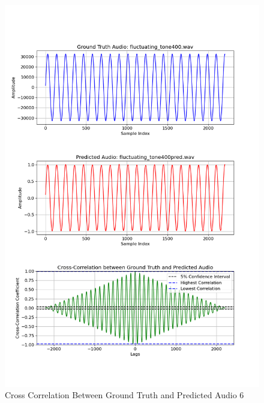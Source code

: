 \documentclass{ioereport}
\begin{document}
    \begin{figure}[H]
        \centering
        \includegraphics[width=\linewidth]{assets/crosscorrelation/cross_correlation_fluctuating_tone400.wav_fluctuating_tone400pred.wav.png}
        \caption{Cross Correlation Between Ground Truth and Predicted Audio 6}
        \label{fig:cross-correlation-6}
    \end{figure}
\end{document}

